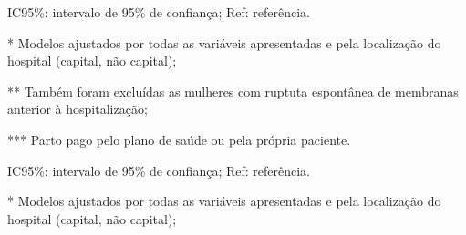 \documentclass{article}
\begin{document}









IC95\%: intervalo de 95\% de confiança; Ref: referência.

* Modelos ajustados por todas as variáveis apresentadas e pela
localização do hospital (capital, não capital);

** Também foram excluídas as mulheres com ruptuta espontânea de
membranas anterior à hospitalização;

*** Parto pago pelo plano de saúde ou pela própria paciente.

IC95\%: intervalo de 95\% de confiança; Ref: referência.

* Modelos ajustados por todas as variáveis apresentadas e pela
localização do hospital (capital, não capital);
\end{document}

